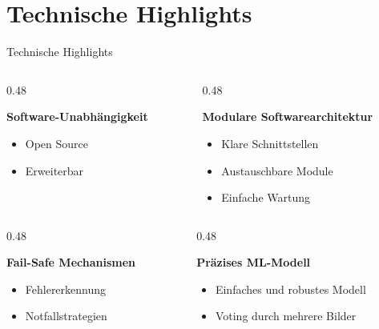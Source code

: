 \documentclass[aspectratio=169]{beamer}
\begin{document}
	\section{Technische Highlights}
	
	\begin{frame}{Technische Highlights}

	\begin{columns}[T]
		\begin{column}{0.48\textwidth}
			\begin{block}{\textbf{Software-Unabhängigkeit}}
				\begin{itemize}
					\item Open Source
					\item Erweiterbar
				\end{itemize}
			\end{block}
		\end{column}

		\begin{column}{0.48\textwidth}
			\begin{block}{\textbf{Modulare Softwarearchitektur}}
				\begin{itemize}
					\item Klare Schnittstellen
					\item Austauschbare Module
					\item Einfache Wartung
				\end{itemize}
			\end{block}
		\end{column}
	\end{columns}

	\vspace{0.3cm}

	\begin{columns}[T]
		\begin{column}{0.48\textwidth}
			\begin{block}{\textbf{Fail-Safe Mechanismen}}
				\begin{itemize}
					\item Fehlererkennung
					\item Notfallstrategien
				\end{itemize}
			\end{block}
		\end{column}

		\begin{column}{0.48\textwidth}
			\begin{block}{\textbf{Präzises ML-Modell}}
				\begin{itemize}
					\item Einfaches und robustes Modell
					\item Voting durch mehrere Bilder
				\end{itemize}
			\end{block}
		\end{column}
	\end{columns}

	\end{frame}
	
\end{document}
